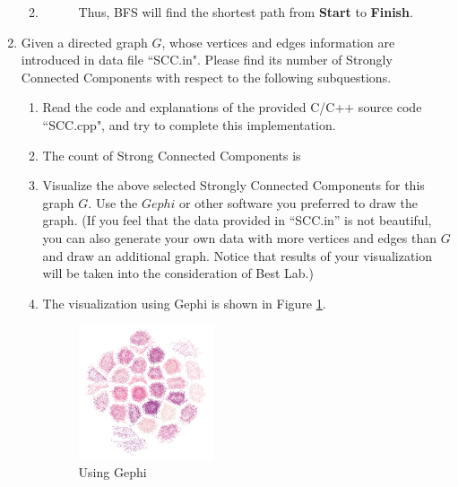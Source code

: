 \documentclass[12pt,a4paper]{article}
\makeatletter
\newtheorem*{solution}{Solution}
\theoremstyle{definition}
\renewenvironment{solution}[1][Solution] {\par\pushQED{\qed}\normalfont\topsep6\p@\@plus6\p@\relax\trivlist\item[\hskip\labelsep\bfseries#1\@addpunct{.}]\ignorespaces}{\popQED\endtrivlist\@endpefalse} \makeatother
\makeatother
\begin{document}
\begin{enumerate}
\begin{enumerate}
\begin{solution}
\begin{description}
                Thus, BFS will find the shortest path from \textbf{Start} to \textbf{Finish}.
                
            \end{description}
        \end{solution}
    \end{enumerate}
	
	\item Given a directed graph $G$, whose vertices and edges information are introduced in data file ``SCC.in". Please find its number of Strongly Connected Components with respect to the following subquestions.
    
    \begin{enumerate}
    	\item Read the code and explanations of the provided C/C++ source code ``SCC.cpp", and try to complete this implementation.
    	\begin{solution}
            The count of Strong Connected Components is
            \begin{tcolorbox}
                
            \end{tcolorbox}
        \end{solution}
    	\item Visualize the above selected Strongly Connected Components for this graph $G$. Use the $Gephi$ or other software you preferred to draw the graph. {\color{blue}(If you feel that the data provided in ``SCC.in'' is not beautiful, you can also generate your own data with more vertices and edges than $G$ and draw an additional graph. Notice that results of your visualization will be taken into the consideration of Best Lab.)}
    	\begin{solution}
            The visualization using Gephi is shown in Figure \ref{fig:gephi}.
            \begin{figure}[h]
                \centering
                \includegraphics[width=0.4\textwidth]{img/ZilongLi1.png}
                \caption{Using Gephi}
                \label{fig:gephi}
            \end{figure}


\end{solution}
\end{enumerate}
\end{enumerate}
\end{document}
